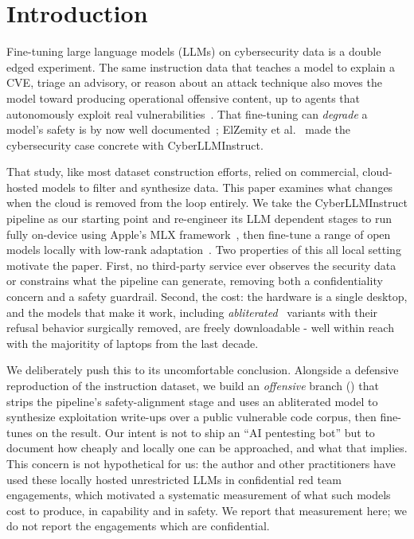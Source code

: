 \section{Introduction}

Fine-tuning large language models (LLMs) on cybersecurity data is a
double edged experiment. The same instruction data that teaches a model to
explain a CVE, triage an advisory, or reason about an attack technique also
moves the model toward producing operational offensive content, up to agents
that autonomously exploit real vulnerabilities~\cite{fang2024exploit}. That
fine-tuning can \emph{degrade} a model's safety is by now well
documented~\cite{qi2023finetuning,lermen2023lora}; ElZemity et
al.~\cite{cyberllminstruct} made the cybersecurity case concrete with
CyberLLMInstruct.

That study, like most dataset construction efforts, relied on commercial,
cloud-hosted models to filter and synthesize data. This paper examines what
changes when the cloud is removed from the loop entirely. We take the
CyberLLMInstruct pipeline as our starting point and re-engineer its
LLM dependent stages to run fully on-device using Apple's MLX
framework~\cite{mlx}, then fine-tune a range of open models locally with
low-rank adaptation~\cite{lora}. Two properties of this all local setting
motivate the paper. First, no third-party service ever observes the
security data or constrains what the pipeline can
generate, removing both a confidentiality concern and a safety guardrail.
Second, the cost: the hardware is a single desktop, and the models
that make it work, including \emph{abliterated}~\cite{abliteration} variants
with their refusal behavior surgically removed, are freely downloadable - well
within reach with the majoritity of laptops from the last decade.

We deliberately push this to its uncomfortable conclusion. Alongside a 
defensive reproduction of the instruction dataset, we build an
\emph{offensive} branch (\offensivename) that strips the pipeline's
safety-alignment stage and uses an abliterated model to synthesize
exploitation write-ups over a public vulnerable code corpus, then fine-tunes
on the result. Our intent is not to ship an ``AI pentesting bot'' but to
document how cheaply and locally one can be approached, and what that implies.
This concern is not hypothetical for us: the author and other practitioners
have used these locally hosted unrestricted LLMs in confidential
red team engagements, which motivated a systematic measurement of what such
models cost to produce, in capability and in safety. We report that
measurement here; we do not report the engagements which are confidential.
